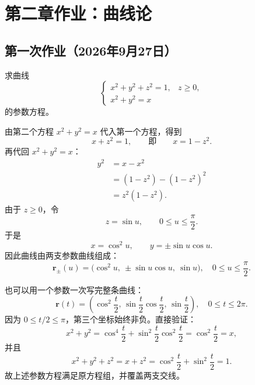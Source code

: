\begingroup
\chapter*{第二章作业：曲线论}
\setcounter{section}{0}
\renewcommand{\thesection}{\arabic{section}}
\renewcommand{\thechapter}{2}
\renewcommand{\theHsection}{homework.curves.\arabic{section}}

\section{第一次作业（2026年9月27日）}
\label{hw:curves:first}
\begin{homework}[教材第 28 页，习题 2.1 第 4 题]
\par\smallskip
求曲线
\[
\begin{cases}
x^2+y^2+z^2=1, & z\geq0,\\
x^2+y^2=x
\end{cases}
\]
的参数方程。
\end{homework}

\begin{solution}
由第二个方程 $x^2+y^2=x$ 代入第一个方程，得到
\[
x+z^2=1,
\qquad\text{即}\qquad
x=1-z^2.
\]
再代回 $x^2+y^2=x$：
\begin{align*}
y^2
&=x-x^2\\
&=(1-z^2)-(1-z^2)^2\\
&=z^2(1-z^2).
\end{align*}
由于 $z\geq0$，令
\[
z=\sin u,\qquad 0\leq u\leq\frac{\pi}{2}.
\]
于是
\[
x=\cos^2u,\qquad
y=\pm\sin u\cos u.
\]
因此曲线由两支参数曲线组成：
\[
\boxed{
\bm r_\pm(u)
=\bigl(\cos^2u,\ \pm\sin u\cos u,\ \sin u\bigr),
\quad
0\leq u\leq\frac{\pi}{2}.
}
\]

也可以用一个参数一次写完整条曲线：
\[
\boxed{
\bm r(t)
=\left(
\cos^2\frac t2,\,
\sin\frac t2\cos\frac t2,\,
\sin\frac t2
\right),
\quad 0\leq t\leq2\pi.
}
\]
因为 $0\leq t/2\leq\pi$，第三个坐标始终非负。直接验证：
\[
x^2+y^2
=\cos^4\frac t2+\sin^2\frac t2\cos^2\frac t2
=\cos^2\frac t2=x,
\]
并且
\[
x^2+y^2+z^2=x+z^2
=\cos^2\frac t2+\sin^2\frac t2=1.
\]
故上述参数方程满足原方程组，并覆盖两支交线。
\end{solution}

